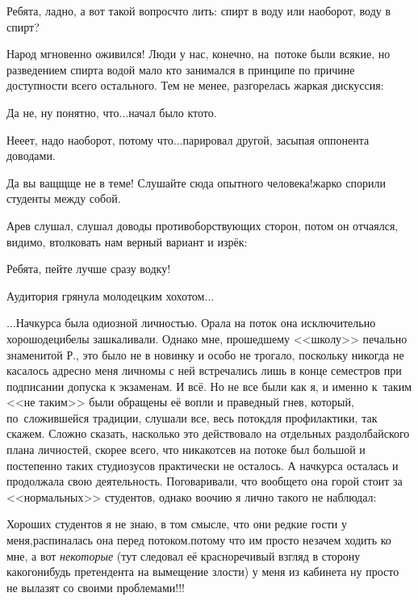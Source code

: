 \diagdash Ребята, ладно, а вот такой вопрос\mdash что лить: спирт в воду или наоборот, воду в спирт?

Народ мгновенно оживился! Люди у нас, конечно, на~потоке были всякие, но разведением спирта водой мало кто занимался в принципе по причине доступности всего остального. Тем не менее, разгорелась жаркая дискуссия:

\diagdash Да не, ну понятно, что$\ldots$\mdash начал было кто\sdash то.

\diagdash Не\sdash е\sdash ет, надо наоборот, потому что$\ldots$\mdash парировал другой, засыпая оппонента доводами.

\diagdash Да вы ващ\sdash щ\sdash ще не в теме! Слушайте сюда опытного человека!\mdash жарко спорили студенты между собой.

Ар\sdash ев слушал, слушал доводы противоборствующих сторон, потом он отчаялся, видимо, втолковать нам верный вариант и изрёк:

\diagdash Ребята, пейте лучше сразу водку!%

Аудитория грянула молодецким хохотом$\ldots$

\vspace{1.0cm}

$\ldots$Начкурса была одиозной личностью. Орала на поток она исключительно хорошо\mdash децибелы зашкаливали. Однако мне, прошедшему <<школу>> печально знаменитой Р., это было не в новинку и особо не трогало, поскольку никогда не касалось адресно меня лично\mdash мы с ней встречались лишь в конце семестров при подписании допуска к экзаменам. И всё. Но не все были как я, и именно к~таким <<не таким>> были обращены её вопли и праведный гнев, который, по~сложившейся традиции, слушали все, весь поток\mdash для профилактики, так скажем. Сложно сказать, насколько это действовало на отдельных раздолбайского плана личностей, скорее всего, что никак\mdash отсев на потоке был большой и постепенно таких студиозусов практически не осталось. А начкурса осталась и продолжала свою деятельность. Поговаривали, что вообще\sdash то она горой стоит за <<нормальных>> студентов, однако воочию я лично такого не наблюдал:

\diagdash Хороших студентов я не знаю, в том смысле, что они редкие гости у меня,\mdash распиналась она перед потоком.\mdash потому что им просто незачем ходить ко мне, а вот \textit{некоторые} (тут следовал её красноречивый взгляд в сторону какого\sdash нибудь претендента на вымещение злости) у меня из кабинета ну просто не вылазят со своими проблемами!!!

